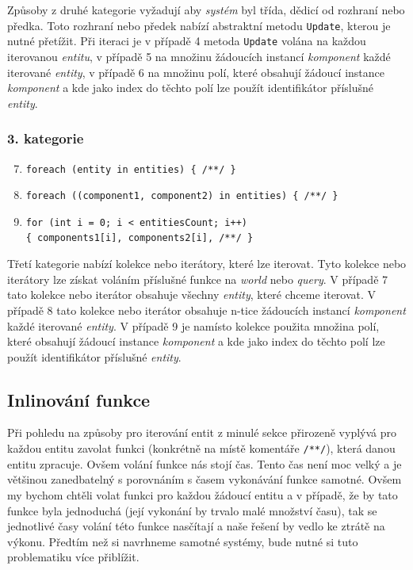 Způsoby z druhé kategorie vyžadují aby \textit{systém} byl třída, dědicí od rozhraní nebo předka. Toto rozhraní nebo předek nabízí abstraktní metodu \verb|Update|, kterou je nutné přetížit. Při iteraci je v případě 4 metoda \verb|Update| volána na každou iterovanou \textit{entitu}, v případě 5 na množinu žádoucích instancí \textit{komponent} každé iterované \textit{entity}, v případě 6 na množinu polí, které obsahují žádoucí instance \textit{komponent} a kde jako index do těchto polí lze použít identifikátor příslušné \textit{entity}.

\subsubsection{3. kategorie}

\begin{enumerate}
    \setcounter{enumi}{6}
    \item \verb|foreach (entity in entities) { /**/ }|
    \item \verb|foreach ((component1, component2) in entities) { /**/ }|
    \item \verb|for (int i = 0; i < entitiesCount; i++)|\\\verb|{ components1[i], components2[i], /**/ }|
\end{enumerate}

Třetí kategorie nabízí kolekce nebo iterátory, které lze iterovat. Tyto kolekce nebo iterátory lze získat voláním příslušné funkce na \textit{world} nebo \textit{query}. V případě 7 tato kolekce nebo iterátor obsahuje všechny \textit{entity}, které chceme iterovat. V případě 8 tato kolekce nebo iterátor obsahuje n-tice žádoucích instancí \textit{komponent} každé iterované \textit{entity}. V případě 9 je namísto kolekce použita množina polí, které obsahují žádoucí instance \textit{komponent} a kde jako index do těchto polí lze použít identifikátor příslušné \textit{entity}.

\subsection{Inlinování funkce}
Při pohledu na způsoby pro iterování entit z minulé sekce přirozeně vyplývá pro každou entitu zavolat funkci (konkrétně na místě komentáře \verb|/**/|), která danou entitu zpracuje. Ovšem volání funkce nás stojí čas. Tento čas není moc velký a je většinou zanedbatelný s porovnáním s časem vykonávání funkce samotné. Ovšem my bychom chtěli volat funkci pro každou žádoucí entitu a v případě, že by tato funkce byla jednoduchá (její vykonání by trvalo malé množství času), tak se jednotlivé časy volání této funkce nasčítají a naše řešení by vedlo ke ztrátě na výkonu. Předtím než si navrhneme samotné systémy, bude nutné si tuto problematiku více přiblížit.

